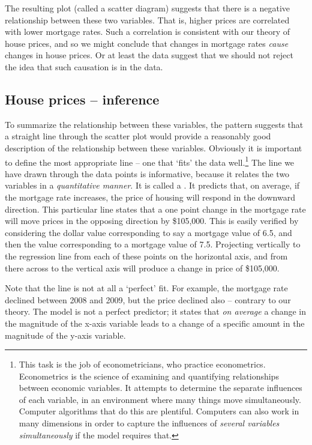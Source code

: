 

The resulting plot (called a scatter diagram) suggests that there is a
negative relationship between these two variables. That is, higher prices
are correlated with lower mortgage rates. Such a correlation is consistent
with our theory of house prices, and so we might conclude that changes in
mortgage rates \textit{cause} changes in house prices. Or at least the data
suggest that we should not reject the idea that such causation is in the
data.

\newhtmlpage

\subsection*{House prices -- inference}

To summarize the relationship between these variables, the pattern suggests
that a straight line through the scatter plot would provide a reasonably
good description of the relationship between these variables. Obviously it
is important to define the most appropriate line -- one that `fits' the data
well.\footnote{This task is the job of econometricians, who practice econometrics.
Econometrics is the science of examining and quantifying relationships
between economic variables. It attempts to determine the separate influences
of each variable, in an environment where many things move simultaneously.
Computer algorithms that do this are plentiful. Computers can also work in
many dimensions in order to capture the influences of \textit{several
variables simultaneously} if the model requires that.} The line we have
drawn through the data points is informative, because it relates the two
variables in a \textit{quantitative manner}. It is called a . It predicts that, on average, if the mortgage rate
increases, the price of housing will respond in the downward direction. This
particular line states that a one point change in the mortgage rate will
move prices in the opposing direction by \$105,000. This is easily verified
by considering the dollar value corresponding to say a mortgage value of
6.5, and then the value corresponding to a mortgage value of 7.5. Projecting
vertically to the regression line from each of these points on the
horizontal axis, and from there across to the vertical axis will produce a
change in price of \$105,000. 

Note that the line is not at all a `perfect' fit. For example, the mortgage
rate declined between 2008 and 2009, but the price declined also -- contrary
to our theory. The model is not a perfect predictor; it states that \textit{%
on average} a change in the magnitude of the x-axis variable leads to a
change of a specific amount in the magnitude of the y-axis variable.

